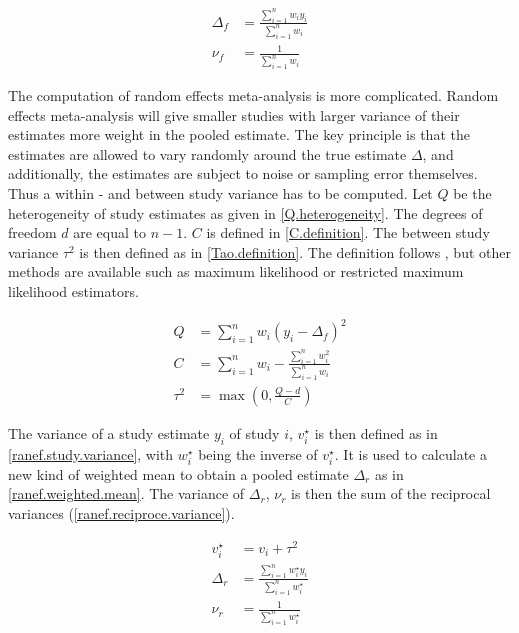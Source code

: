 \documentclass[11pt,a4paper,twoside]{book}\usepackage[]{graphicx}\usepackage[]{color}
\begin{document}
\begin{align}
\Delta_{f} &= \frac{\sum_{i = 1}^n w_{i}y_{i}}{\sum_{i = 1}^n w_{i}} \label{weighted.mean} \\
\nu_{f} &= \frac{1}{\sum_{i = 1}^n w_{i}} \label{reciproce.variance}
\end{align}

The computation of random effects meta-analysis is more complicated. Random effects meta-analysis will give smaller studies with larger variance of their estimates more weight in the pooled estimate. The key principle is that the estimates are allowed to vary randomly around the true estimate $\Delta$, and additionally, the estimates are subject to noise or sampling error themselves. Thus a within - and between study variance has to be computed.
Let $Q$ be the heterogeneity of study estimates as given in \ref{Q.heterogeneity}. The degrees of freedom $d$ are equal to $n-1$. $C$ is defined in \ref{C.definition}. The between study variance $\tau^2$ is then defined as in \ref{Tao.definition}. The definition follows \citet{tau.estimator}, but other methods are available such as maximum likelihood or restricted maximum likelihood estimators. 

\begin{align}
Q &= \sum_{i = 1}^n w_{i}(y_{i} - \Delta_{f})^2 \label{Q.heterogeneity} \\
C &= \sum_{i = 1}^n w_{i} - \frac{\sum_{i = 1}^n w_{i}^2}{\sum_{i = 1}^n w_{i}} \label{C.definition} \\
\tau^2 &= \max(0, \frac{Q - d}{C}) \label{Tau.definition}
\end{align}

The variance of a study estimate $y_{i}$ of study $i$, $v_{i}^\star$ is then defined as in \ref{ranef.study.variance}, with $w_{i}^\star$ being the inverse of $v_{i}^\star$. It is used to calculate a new kind of weighted mean to obtain a pooled estimate $\Delta_{r}$ as in \ref{ranef.weighted.mean}. The variance of $\Delta_{r}$, $\nu_{r}$ is then the sum of the reciprocal variances (\ref{ranef.reciproce.variance}).

\begin{align}
v_{i}^\star &= v_{i} + \tau^2 \label{ranef.study.variance} \\
\Delta_{r} &= \frac{\sum_{i = 1}^n w_{i}^\star y_{i}}{\sum_{i = 1}^n w_{i}^\star} \label{ranef.weighted.mean} \\
\nu_{r} &= \frac{1}{\sum_{i = 1}^n w_{i}^\star} \label{ranef.reciproce.variance}
\end{align}
\end{document}
